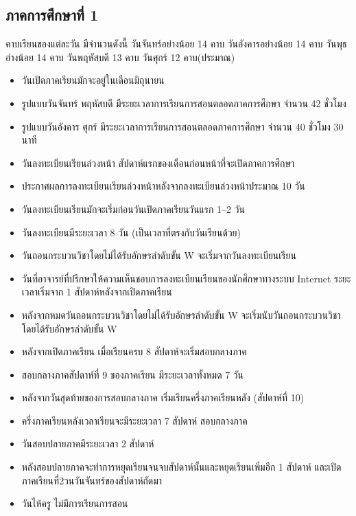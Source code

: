 \subsection{ภาคการศึกษาที่ 1}
  คาบเรียนของแต่ละวัน มีจำนวนดังนี้ วันจันทร์อย่างน้อย 14 คาบ วันอังคารอย่างน้อย 14 คาบ วันพุธอ่างน้อย 14 คาบ วันพฤหัสบดี 13 คาบ วันศุกร์ 12 คาบ(ประมาณ)
\begin{itemize}
  \item วันเปิดภาคเรียนมักจะอยู่ในเดือนมิถุนายน
  \item รูปแบบวันจันทร์ พฤหัสบดี มีระยะเวลาการเรียนการสอนตลอดภาคการศึกษา จำนวน 42 ชั่วโมง
  \item รูปแบบวันอังคาร ศุกร์ มีระยะเวลาการเรียนการสอนตลอดภาคการศึกษา จำนวน 40 ชั่วโมง 30 นาที
  \item วันลงทะเบียนเรียนล่วงหน้า สัปดาห์แรกของเดือนก่อนหน้าที่จะเปิดภาคการศึกษา
  \item ประกาศผลการลงทะเบียนเรียนล่วงหน้าหลังจากลงทะเบียนล่วงหน้าประมาณ 10 วัน
  \item วันลงทะเบียนเรียนมักจะเริ่มก่อนวันเปิดภาคเรียนวันแรก 1--2 วัน
  \item วันลงทะเบียนมีระยะเวลา 8 วัน (เป็นเวลาที่ตรงกับวันเรียนด้วย)
  \item วันถอนกระบวนวิชาโดยไม่ได้รับอักษรลำดับขั้น W จะเริ่มจากวันลงทะเบียนเรียน 
  \item วันที่อาจารย์ที่ปรึกษาให้ความเห็นชอบการลงทะเบียนเรียนของนักศึกษาทางระบบ Internet ระยะเวลาเริ่มจาก 1 สัปดาห์หลังจากเปิดภาคเรียน
  \item หลังจากหมดวันถอนกระบวนวิชาโดยไม่ได้รับอักษรลำดับขั้น W จะเริ่มนับวันถอนกระบวนวิชาโดยได้รับอักษรลำดับขั้น W
  \item หลังจากเปิดภาคเรียน เมื่อเรียนครบ 8 สัปดาห์จะเริ่มสอบกลางภาค
  \item สอบกลางภาคสัปดาห์ที่ 9 ของภาคเรียน มีระยะเวลาทั้งหมด 7 วัน
  \item หลังจากวันสุดท้ายของการสอบกลางภาค เริ่มเรียนครึ่งภาคเรียนหลัง (สัปดาห์ที่ 10)
  \item ครึ่งภาคเรียนหลังเวลาเรียนจะมีระยะเวลา 7 สัปดาห์ สอบกลางภาค
  \item วันสอบปลายภาคมีระยะเวลา 2 สัปดาห์
  \item หลังสอบปลายภาคจะทำการหยุดเรียนจนจบสัปดาห์นั้นและหยุดเรียนเพิ่มอีก 1 สัปดาห์ และเปิดภาคเรียนที่2วนวันจันทร์ของสัปดาห์ถัดมา
  \item วันไห้ครู ไม่มีการเรียนการสอน
\end{itemize}

